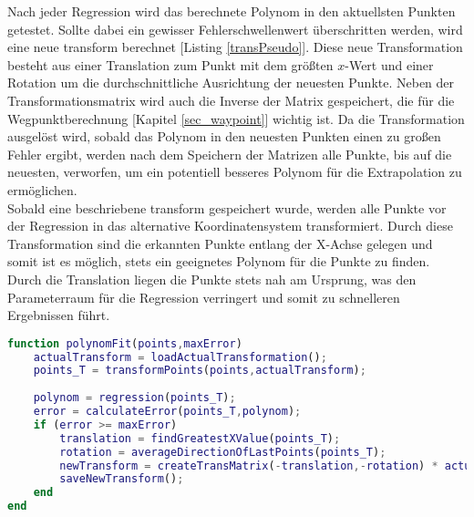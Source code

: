 Nach jeder Regression wird das berechnete Polynom in den aktuellsten Punkten getestet. Sollte dabei ein gewisser Fehlerschwellenwert überschritten werden, wird eine neue \gls{transform} berechnet [Listing \ref{transPseudo}]. Diese neue Transformation besteht aus einer Translation zum Punkt mit dem größten $x$-Wert und einer Rotation um die durchschnittliche Ausrichtung der neuesten Punkte. Neben der Transformationsmatrix wird auch die Inverse der Matrix gespeichert, die für die Wegpunktberechnung [Kapitel \ref{sec_waypoint}] wichtig ist. Da die Transformation ausgelöst wird, sobald das Polynom in den neuesten Punkten einen zu großen Fehler ergibt, werden nach dem Speichern der Matrizen alle Punkte, bis auf die neuesten, verworfen, um ein potentiell besseres Polynom für die Extrapolation zu ermöglichen.\\
Sobald eine beschriebene \gls{transform} gespeichert wurde, werden alle Punkte vor der Regression in das alternative Koordinatensystem transformiert. Durch diese Transformation sind die erkannten Punkte entlang der X-Achse gelegen und somit ist es möglich, stets ein geeignetes Polynom für die Punkte zu finden. Durch die Translation liegen die Punkte stets nah am Ursprung, was den Parameterraum für die Regression verringert und somit zu schnelleren Ergebnissen führt.\label{alterWorldCoords}
\begin{lstlisting}[language=Matlab,caption=Pseudocode des Schätzverfahrens,label=transPseudo]
function polynomFit(points,maxError)
	actualTransform = loadActualTransformation();
	points_T = transformPoints(points,actualTransform);
	
	polynom = regression(points_T);
	error = calculateError(points_T,polynom);
	if (error >= maxError)
		translation = findGreatestXValue(points_T);
		rotation = averageDirectionOfLastPoints(points_T);
		newTransform = createTransMatrix(-translation,-rotation) * actualTransform;
		saveNewTransform();
	end
end
\end{lstlisting}



